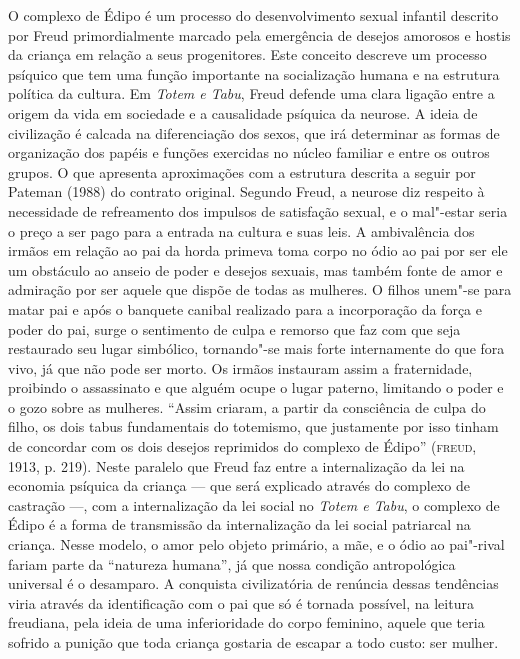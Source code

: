 O complexo de Édipo é um processo do desenvolvimento sexual infantil
descrito por Freud primordialmente marcado pela emergência de desejos
amorosos e hostis da criança em relação a seus progenitores. Este
conceito descreve um processo psíquico que tem uma função importante na
socialização humana e na estrutura política da cultura. Em \emph{Totem e Tabu},
Freud defende uma clara ligação entre a origem da vida em
sociedade e a causalidade psíquica da neurose. A ideia de civilização é
calcada na diferenciação dos sexos, que irá determinar as formas de
organização dos papéis e funções exercidas no núcleo familiar e entre os
outros grupos. O que apresenta aproximações com a estrutura descrita a
seguir por Pateman (1988) do contrato original. Segundo Freud, a neurose
diz respeito à necessidade de refreamento dos impulsos de satisfação
sexual, e o mal"-estar seria o preço a ser pago para a entrada na cultura
e suas leis. A ambivalência dos irmãos em relação ao pai da horda
primeva toma corpo no ódio ao pai por ser ele um obstáculo ao anseio de
poder e desejos sexuais, mas também fonte de amor e admiração por ser
aquele que dispõe de todas as mulheres. O filhos unem"-se para matar pai
e após o banquete canibal realizado para a incorporação da força e poder
do pai, surge o sentimento de culpa e remorso que faz com que seja
restaurado seu lugar simbólico, tornando"-se mais forte internamente do
que fora vivo, já que não pode ser morto. Os irmãos instauram assim a
fraternidade, proibindo o assassinato e que alguém ocupe o lugar
paterno, limitando o poder e o gozo sobre as mulheres. ``Assim criaram,
a partir da consciência de culpa do filho, os dois tabus fundamentais do
totemismo, que justamente por isso tinham de concordar com os dois
desejos reprimidos do complexo de Édipo'' (\textsc{freud}, 1913, p. 219). Neste
paralelo que Freud faz entre a internalização da lei na economia
psíquica da criança --- que será explicado através do complexo de
castração ---, com a internalização da lei social no \emph{Totem e Tabu}, o
complexo de Édipo é a forma de transmissão da internalização da lei
social patriarcal na criança. Nesse modelo, o amor pelo objeto primário,
a mãe, e o ódio ao pai"-rival fariam parte da ``natureza humana'', já que
nossa condição antropológica universal é o desamparo. A conquista
civilizatória de renúncia dessas tendências viria através da
identificação com o pai que só é tornada possível, na leitura freudiana,
pela ideia de uma inferioridade do corpo feminino, aquele que teria
sofrido a punição que toda criança gostaria de escapar a todo custo: ser
mulher.

